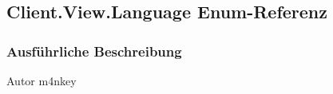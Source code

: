 \hypertarget{a00052}{\subsection{Client.\-View.\-Language Enum-\/\-Referenz}
\label{a00052}
}


\subsubsection{Ausführliche Beschreibung}
\begin{DoxyAuthor}{Autor}
m4nkey 
\end{DoxyAuthor}
